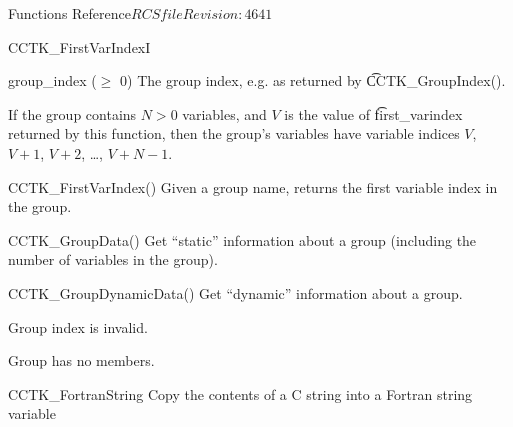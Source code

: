 \begin{cactuspart}{ Functions Reference}{$RCSfile$}{$Revision: 4641 $}
\begin{FunctionDescription}{CCTK\_FirstVarIndexI}
\begin{ParameterSection}
\begin{Parameter}{group\_index ($\ge$ 0)}
The group index, e.g. as returned by {\t CCTK\_GroupIndex()}.
\end{Parameter}
\end{ParameterSection}

\begin{Discussion}
If the group contains $N > 0$ variables, and $V$ is the value of
{\t first\_varindex} returned by this function, then the group's
variables have variable indices $V$, $V+1$, $V+2$, \dots, $V+N-1$.
\end{Discussion}

\begin{SeeAlsoSection}
\begin{SeeAlso}{CCTK\_FirstVarIndex()}
Given a group name, returns the first variable index in the group.
\end{SeeAlso}
\begin{SeeAlso}{CCTK\_GroupData()}
Get ``static'' information about a group
(including the number of variables in the group).
\end{SeeAlso}
\begin{SeeAlso}{CCTK\_GroupDynamicData()}
Get ``dynamic'' information about a group.
\end{SeeAlso}
\end{SeeAlsoSection}

\begin{ErrorSection}
\begin{Error}{-1}
Group index is invalid.
\end{Error}
\begin{Error}{-2}
Group has no members.
\end{Error}
\end{ErrorSection}
\end{FunctionDescription}


\begin{FunctionDescription}{CCTK\_FortranString}
\label{CCTK-FortranString}
Copy the contents of a C string into a Fortran string variable


\end{FunctionDescription}
\end{cactuspart}
